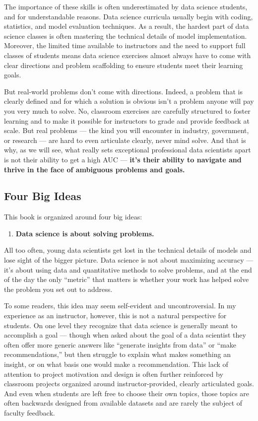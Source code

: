 \documentclass[12pt]{article}
\begin{document}
The importance of these skills is often underestimated by data science
students, and for understandable reasons. Data science curricula usually
begin with coding, statistics, and model evaluation techniques. As a
result, the hardest part of data science classes is often mastering the
technical details of model implementation. Moreover, the limited time
available to instructors and the need to support full classes of
students means data science exercises almost always have to come with
clear directions and problem scaffolding to ensure students meet their
learning goals.

But real-world problems don't come with directions. Indeed, a problem
that is clearly defined and for which a solution is obvious isn't a
problem anyone will pay you very much to solve. No, classroom exercises
are carefully structured to foster learning and to make it possible for
instructors to grade and provide feedback at scale. But real problems
--- the kind you will encounter in industry, government, or research ---
are hard to even articulate clearly, never mind solve. And that is why,
as we will see, what really sets exceptional professional data
scientists apart is not their ability to get a high AUC --- \textbf{it's
their ability to navigate and thrive in the face of ambiguous problems
and goals.}

\subsection*{Four Big Ideas}\label{four-big-ideas}

This book is organized around four big ideas:

\begin{enumerate}
\def\labelenumi{\arabic{enumi}.}

\item
  \textbf{Data science is about solving problems.}
\end{enumerate}

All too often, young data scientists get lost in the technical details
of models and lose sight of the bigger picture. Data science is not
about maximizing accuracy --- it's about using data and quantitative
methods to solve problems, and at the end of the day the only ``metric''
that matters is whether your work has helped solve the problem you set
out to address.

To some readers, this idea may seem self-evident and uncontroversial. In
my experience as an instructor, however, this is not a natural
perspective for students. On one level they recognize that data science
is generally meant to accomplish a goal --- though when asked about the
goal of a data scientist they often offer more generic answers like
``generate insights from data'' or ``make recommendations,'' but then
struggle to explain what makes something an insight, or on what basis
one would make a recommendation. This lack of attention to project
motivation and design is often further reinforced by classroom projects
organized around instructor-provided, clearly articulated goals. And
even when students are left free to choose their own topics, those
topics are often backwards designed from available datasets and are
rarely the subject of faculty feedback.
\end{document}
